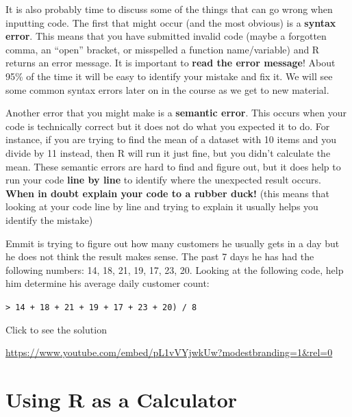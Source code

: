 \documentclass[
  letterpaper,
  DIV=11,
  numbers=noendperiod]{scrreprt}
\begin{document}
It is also probably time to discuss some of the things that can go wrong
when inputting code. The first that might occur (and the most obvious)
is a \textbf{syntax error}. This means that you have submitted invalid
code (maybe a forgotten comma, an ``open'' bracket, or misspelled a
function name/variable) and R returns an error message. It is important
to \textbf{read the error message}! About 95\% of the time it will be
easy to identify your mistake and fix it. We will see some common syntax
errors later on in the course as we get to new material.

Another error that you might make is a \textbf{semantic error}. This
occurs when your code is technically correct but it does not do what you
expected it to do. For instance, if you are trying to find the mean of a
dataset with 10 items and you divide by 11 instead, then R will run it
just fine, but you didn't calculate the mean. These semantic errors are
hard to find and figure out, but it does help to run your code
\textbf{line by line} to identify where the unexpected result occurs.
\textbf{When in doubt explain your code to a rubber duck!} (this means
that looking at your code line by line and trying to explain it usually
helps you identify the mistake)

\begin{tcolorbox}[enhanced jigsaw, leftrule=.75mm, arc=.35mm, coltitle=black, rightrule=.15mm, bottomrule=.15mm, toprule=.15mm, left=2mm, colbacktitle=quarto-callout-tip-color!10!white, title=\textcolor{quarto-callout-tip-color}{\faLightbulb}\hspace{0.5em}{Try it Out}, toptitle=1mm, breakable, colframe=quarto-callout-tip-color-frame, bottomtitle=1mm, titlerule=0mm, colback=white, opacityback=0, opacitybacktitle=0.6]

Emmit is trying to figure out how many customers he usually gets in a
day but he does not think the result makes sense. The past 7 days he has
had the following numbers: 14, 18, 21, 19, 17, 23, 20. Looking at the
following code, help him determine his average daily customer count:

\texttt{\textgreater{}\ 14\ +\ 18\ +\ 21\ +\ 19\ +\ 17\ +\ 23\ +\ 20)\ /\ 8}

Click to see the solution

\url{https://www.youtube.com/embed/pL1vVYjwkUw?modestbranding=1&rel=0}

\end{tcolorbox}

\section{Using R as a Calculator}\label{using-r-as-a-calculator}
\end{document}
